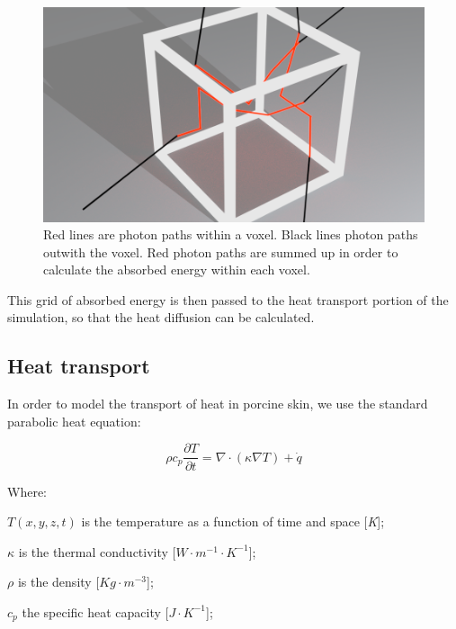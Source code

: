 \begin{figure}
\centering
\includegraphics[scale=0.25]{./ablation/images/jmea-explain.png}
\caption{Red lines are photon paths within a voxel. Black lines photon paths outwith the voxel. Red photon paths are summed up in order to calculate the absorbed energy within each voxel.}
\label{fig:jmea-explain}
\end{figure}	
		
This grid of absorbed energy is then passed to the heat transport portion of the simulation, so that the heat diffusion can be calculated.

\subsection{Heat transport}%

In order to model the transport of heat in porcine skin, we use the standard parabolic heat equation:

\begin{equation}
\rho c_p \frac{\partial T}{\partial t}= \nabla \cdot (\kappa \nabla T) + \dot{q}
\label{eqn:heat}
\end{equation}

\noindent Where:

	\indent $T(x, y, z, t)$ is the temperature as a function of time and space [\textit{K}];
	
	\indent $\kappa$ is the thermal conductivity [$W\cdot m^{-1}\cdot K^{-1}$];
	
	\indent $\rho$ is the density [$Kg \cdot m^{-3}$];
	
	\indent $c_p$ the specific heat capacity [$J\cdot K^{-1}$];
	
